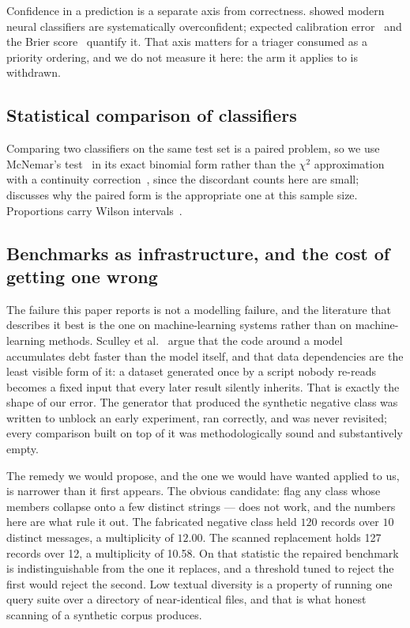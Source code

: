 \documentclass[journal]{IEEEtran}
\providecommand{\citep}[1]{\cite{#1}}
\providecommand{\citet}[1]{\cite{#1}}
\theoremstyle{definition}
\newcommand{\RNfp}{127}
\newcommand{\CMsgFp}{12}
\newcommand{\CMultFp}{10.58}
\begin{document}
Confidence in a prediction is a separate axis from correctness.
\citet{guo2017calibration} showed modern neural classifiers are systematically
overconfident; expected calibration error~\citep{naeini2015ece} and the Brier
score~\citep{brier1950} quantify it. That axis matters for a triager consumed
as a priority ordering, and we do not measure it here: the arm it applies to is
withdrawn.

\subsection{Statistical comparison of classifiers}

Comparing two classifiers on the same test set is a paired problem, so we use
McNemar's test~\citep{mcnemar1947} in its exact binomial form rather than the
$\chi^2$ approximation with a continuity correction~\citep{edwards1948note},
since the discordant counts here are small; \citet{dietterich1998tests} discusses
why the paired form is the appropriate one at this sample size. Proportions
carry Wilson intervals~\citep{wilson1927interval}.

\subsection{Benchmarks as infrastructure, and the cost of getting one wrong}

The failure this paper reports is not a modelling failure, and the literature
that describes it best is the one on machine-learning systems rather than on
machine-learning methods. Sculley et al.~\citep{sculley2015debt} argue that the
code around a model accumulates debt faster than the model itself, and that data
dependencies are the least visible form of it: a dataset generated once by a
script nobody re-reads becomes a fixed input that every later result silently
inherits. That is exactly the shape of our error. The generator that produced
the synthetic negative class was written to unblock an early experiment, ran
correctly, and was never revisited; every comparison built on top of it was
methodologically sound and substantively empty.

The remedy we would propose, and the one we would have wanted applied to us,
is narrower than it first appears. The obvious candidate: flag any class
whose members collapse onto a few distinct strings --- does not work, and the
numbers here are what rule it out. The fabricated negative class held \(120\)
records over \(10\) distinct messages, a multiplicity of \(12.00\). The
scanned replacement holds \RNfp{} records over \CMsgFp{}, a multiplicity of
\CMultFp{}. On that statistic the repaired benchmark is indistinguishable from
the one it replaces, and a threshold tuned to reject the first would reject the
second. Low textual diversity is a property of running one query suite over a
directory of near-identical files, and that is what honest scanning of a
synthetic corpus produces.
\end{document}
